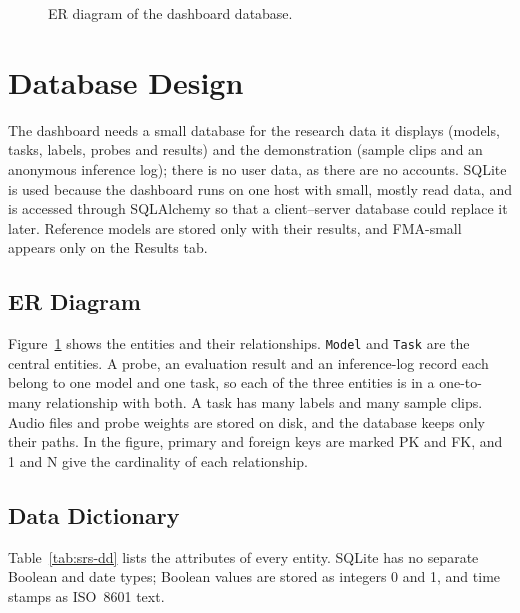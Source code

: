 \documentclass{FastFyp}
\begin{document}
\begin{figure}[tbp]
\caption[ER diagram of the dashboard database]{ER diagram of the dashboard database.}
\label{fig:srs-er}
\end{figure}

\section{Database Design}
\label{sec:srs-db}
The dashboard needs a small database for the research data it displays (models, tasks, labels, probes and results) and the demonstration (sample clips and an anonymous inference log); there is no user data, as there are no accounts. SQLite is used because the dashboard runs on one host with small, mostly read data, and is accessed through SQLAlchemy so that a client--server database could replace it later. Reference models are stored only with their results, and FMA-small appears only on the Results tab.

\subsection{ER Diagram}
Figure~\ref{fig:srs-er} shows the entities and their relationships. \texttt{Model} and \texttt{Task} are the central entities. A probe, an evaluation result and an inference-log record each belong to one model and one task, so each of the three entities is in a one-to-many relationship with both. A task has many labels and many sample clips. Audio files and probe weights are stored on disk, and the database keeps only their paths. In the figure, primary and foreign keys are marked PK and FK, and 1 and N give the cardinality of each relationship.


\subsection{Data Dictionary}
Table~\ref{tab:srs-dd} lists the attributes of every entity. SQLite has no separate Boolean and date types; Boolean values are stored as integers 0 and 1, and time stamps as ISO~8601 text.
\end{document}
